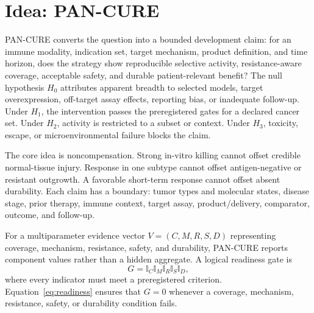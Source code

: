 \documentclass[10pt,conference]{IEEEtran}
\begin{document}
\section{Idea: PAN-CURE}\label{sec:idea}
PAN-CURE converts the question into a bounded development claim: for an immune modality, indication set, target mechanism, product definition, and time horizon, does the strategy show reproducible selective activity, resistance-aware coverage, acceptable safety, and durable patient-relevant benefit? The null hypothesis $H_0$ attributes apparent breadth to selected models, target overexpression, off-target assay effects, reporting bias, or inadequate follow-up. Under $H_1$, the intervention passes the preregistered gates for a declared cancer set. Under $H_2$, activity is restricted to a subset or context. Under $H_3$, toxicity, escape, or microenvironmental failure blocks the claim.

The core idea is noncompensation. Strong in-vitro killing cannot offset credible normal-tissue injury. Response in one subtype cannot offset antigen-negative or resistant outgrowth. A favorable short-term response cannot offset absent durability. Each claim has a boundary: tumor types and molecular states, disease stage, prior therapy, immune context, target assay, product/delivery, comparator, outcome, and follow-up.

For a multiparameter evidence vector $V=(C,M,R,S,D)$ representing coverage, mechanism, resistance, safety, and durability, PAN-CURE reports component values rather than a hidden aggregate. A logical readiness gate is
\begin{equation}
G=\mathbb{I}_{C}\mathbb{I}_{M}\mathbb{I}_{R}\mathbb{I}_{S}\mathbb{I}_{D},\label{eq:readiness}
\end{equation}
where every indicator must meet a preregistered criterion. Equation~\eqref{eq:readiness} ensures that $G=0$ whenever a coverage, mechanism, resistance, safety, or durability condition fails.
\end{document}
